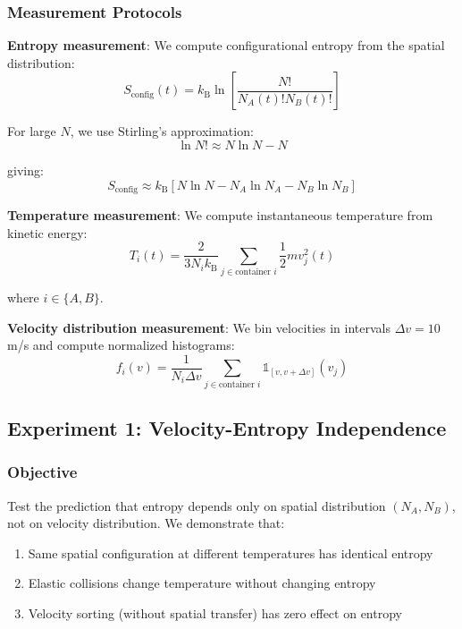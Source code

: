 \documentclass[10pt,twocolumn,letterpaper]{article}
\theoremstyle{definition}
\theoremstyle{remark}
\newcommand{\kb}{k_\text{B}}
\begin{document}
\subsubsection{Measurement Protocols}

\textbf{Entropy measurement}: We compute configurational entropy from the spatial distribution:
\begin{equation}
S_{\text{config}}(t) = \kb \ln\left[\frac{N!}{N_A(t)! N_B(t)!}\right]
\end{equation}

For large $N$, we use Stirling's approximation:
\begin{equation}
\ln N! \approx N \ln N - N
\end{equation}

giving:
\begin{equation}
S_{\text{config}} \approx \kb[N \ln N - N_A \ln N_A - N_B \ln N_B]
\label{eq:entropy_stirling}
\end{equation}

\textbf{Temperature measurement}: We compute instantaneous temperature from kinetic energy:
\begin{equation}
T_i(t) = \frac{2}{3N_i \kb} \sum_{j \in \text{container } i} \frac{1}{2}m v_j^2(t)
\end{equation}

where $i \in \{A, B\}$.

\textbf{Velocity distribution measurement}: We bin velocities in intervals $\Delta v = 10$ m/s and compute normalized histograms:
\begin{equation}
f_i(v) = \frac{1}{N_i \Delta v} \sum_{j \in \text{container } i} \mathbb{1}_{[v, v+\Delta v]}(v_j)
\end{equation}

\subsection{Experiment 1: Velocity-Entropy Independence}

\subsubsection{Objective}

Test the prediction that entropy depends only on spatial distribution $(N_A, N_B)$, not on velocity distribution. We demonstrate that:
\begin{enumerate}
\item Same spatial configuration at different temperatures has identical entropy
\item Elastic collisions change temperature without changing entropy
\item Velocity sorting (without spatial transfer) has zero effect on entropy
\end{enumerate}
\end{document}
